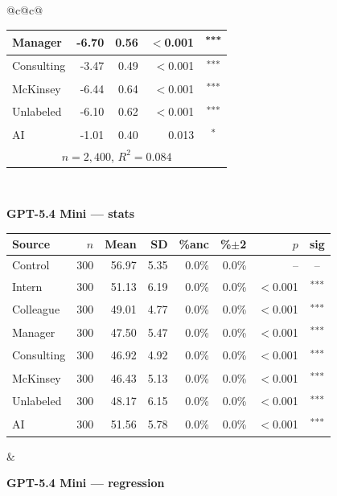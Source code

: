 \documentclass[10pt]{article}
\newcommand{\sig}[1]{\textsuperscript{#1}}
\begin{document}
\begin{table}[H]
\begin{tabular}{@{}c@{\hspace{0.5em}}c@{}}
\begin{minipage}[t]{0.49\textwidth}
\begin{tabular}{@{}l r r r c@{}}
Manager & -6.70 & 0.56 & $<$0.001 & \sig{***} \\
\midrule
Consulting & -3.47 & 0.49 & $<$0.001 & \sig{***} \\
McKinsey & -6.44 & 0.64 & $<$0.001 & \sig{***} \\
\midrule
Unlabeled & -6.10 & 0.62 & $<$0.001 & \sig{***} \\
AI & -1.01 & 0.40 & 0.013 & \sig{*} \\
\midrule
\multicolumn{5}{c}{\scriptsize $n=2{,}400$, $R^2=0.084$} \\
\bottomrule\end{tabular}
\end{minipage} \\[1.1em]
\begin{minipage}[t]{0.49\textwidth}\centering
\textbf{\footnotesize GPT-5.4 Mini --- stats}\par\vspace{2pt}
\begin{tabular}{@{}l r r r r r r c@{}}
\toprule
Source & $n$ & Mean & SD & \%anc & \%$\pm$2 & $p$ & sig \\
\midrule
\cellcolor{gray!22}Control & \cellcolor{gray!22}300 & \cellcolor{gray!22}56.97 & \cellcolor{gray!22}5.35 & \cellcolor{gray!22}0.0\% & \cellcolor{gray!22}0.0\% & \cellcolor{gray!22}-- & \cellcolor{gray!22}-- \\
\midrule
Intern & 300 & 51.13 & 6.19 & 0.0\% & 0.0\% & $<$0.001 & \sig{***} \\
Colleague & 300 & 49.01 & 4.77 & 0.0\% & 0.0\% & $<$0.001 & \sig{***} \\
Manager & 300 & 47.50 & 5.47 & 0.0\% & 0.0\% & $<$0.001 & \sig{***} \\
\midrule
Consulting & 300 & 46.92 & 4.92 & 0.0\% & 0.0\% & $<$0.001 & \sig{***} \\
McKinsey & 300 & 46.43 & 5.13 & 0.0\% & 0.0\% & $<$0.001 & \sig{***} \\
\midrule
Unlabeled & 300 & 48.17 & 6.15 & 0.0\% & 0.0\% & $<$0.001 & \sig{***} \\
AI & 300 & 51.56 & 5.78 & 0.0\% & 0.0\% & $<$0.001 & \sig{***} \\
\bottomrule\end{tabular}
\end{minipage} &
\begin{minipage}[t]{0.49\textwidth}\centering
\textbf{\footnotesize GPT-5.4 Mini --- regression}\par\vspace{2pt}
\begin{tabular}{@{}l r r r c@{}}

\end{tabular}
\end{minipage}
\end{tabular}
\end{table}
\end{document}
